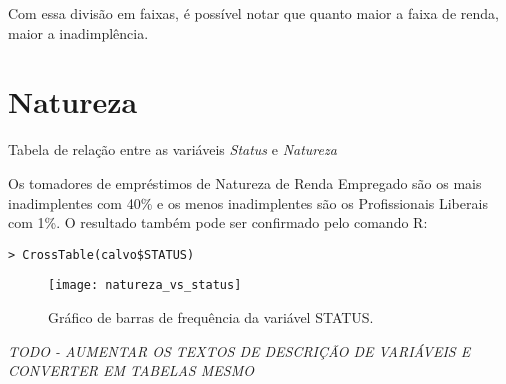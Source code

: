 Com essa divisão em faixas, é possível notar que quanto maior a faixa
de renda, maior a inadimplência.


\section{Natureza}

\begin{table}
\centering

\caption{\label{tab:StatusNatureza}Tabela de relação entre as variáveis \emph{Status
}e \emph{Natureza}}
\end{table}

Os tomadores de empréstimos de Natureza de Renda Empregado são os
mais inadimplentes com 40\% e os menos inadimplentes são os Profissionais
Liberais com 1\%. O resultado também pode ser confirmado pelo comando
R:

\begin{verbatim}
> CrossTable(calvo$STATUS)
\end{verbatim}

\begin{center}
\begin{figure}
\begin{centering}
\texttt{[image: natureza\_vs\_status]}
\par\end{centering}

\caption{\label{fig:FreqStatusVsNatureza}Gráfico de barras de frequência da
variável STATUS.}
\end{figure}

\par\end{center}

\emph{TODO - AUMENTAR OS TEXTOS DE DESCRIÇÃO DE VARIÁVEIS E CONVERTER
EM TABELAS MESMO}
